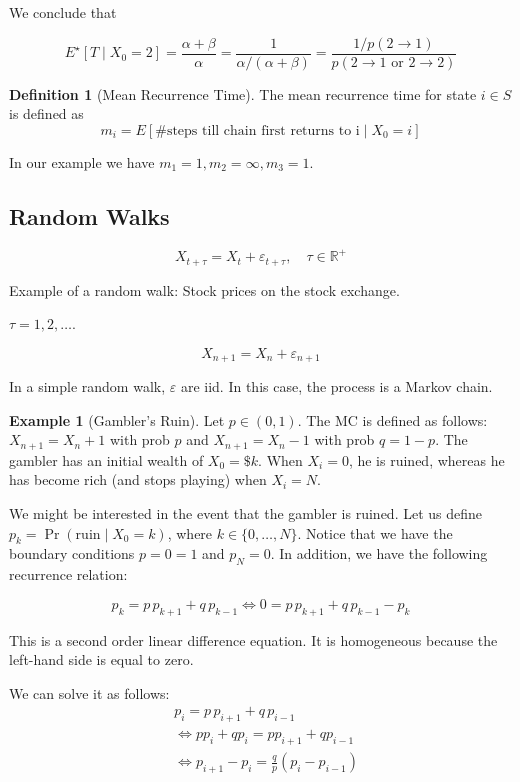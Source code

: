 \documentclass{article}
\theoremstyle{definition}
\newtheorem{exmp}{Example}[section]
\newtheorem{defn}{Definition}[section]
\begin{document}
We conclude that

$$
E^\star \left[ T \mid X_0 =2 \right] = \frac{\alpha+\beta}{\alpha} = \frac{1}{\alpha/(\alpha+\beta)} = \frac{1/p(2\to1)}{p(2\to1 \text{ or } 2 \to 2)}
$$

\begin{defn}[Mean Recurrence Time] The mean recurrence time for state $i \in S$ is defined as
$$
m_i = E \left[ \text{\# steps till chain first returns to i} \mid X_0 = i \right]
$$
\end{defn}

In our example we have $m_1 = 1, m_2 = \infty, m_3 = 1$.

\subsection{Random Walks}

$$
X_{t + \tau} = X_t + \varepsilon_{t + \tau}, \quad \tau \in \mathbb{R}^+
$$

Example of a random walk: Stock prices on the stock exchange.

$\tau = 1,2,\ldots$.

$$
X_{n+1} = X_n + \varepsilon_{n+1}
$$

In a simple random walk, $\varepsilon$ are iid. In this case, the process is a Markov chain.

\begin{exmp}[Gambler's Ruin]
Let $p \in (0,1)$. The MC is defined as follows:
$X_{n+1} = X_n + 1$ with prob $p$ and $X_{n+1} = X_n -1$ with prob $q=1-p$. The gambler has an initial wealth of $X_0 = \$k$. When $X_i = 0$, he is ruined, whereas he has become rich (and stops playing) when $X_i = N$.
\end{exmp}

We might be interested in the event that the gambler is ruined. Let us define $p_k = \Pr \left( \text{ruin} \mid X_0 = k \right)$, where $k \in \{0, \ldots, N\}$.
Notice that we have the boundary conditions $p=0 = 1$ and $p_N = 0$. In addition, we have the following recurrence relation:

$$
p_k = p \, p_{k+1} + q \, p_{k-1} \iff 0 = p \, p_{k+1} + q \, p_{k-1} - p_k
$$

This is a second order linear difference equation. It is homogeneous because the left-hand side is equal to zero.

We can solve it as follows:
\begin{align*}
&p_i = p \, p_{i+1} + q \, p_{i-1} \\
&\iff p p_i + q p_i = p p_{i+1} + q p_{i-1} \\
&\iff p_{i+1} - p_i = \tfrac{q}{p} \left( p_i - p_{i-1} \right)
\end{align*}
\end{document}
